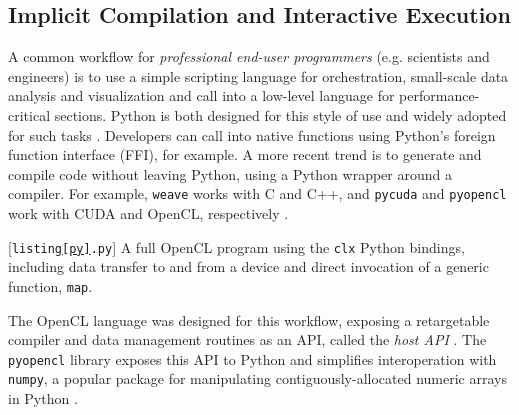 \documentclass[10pt,preprint]{sigplanconf}
\begin{document}
{\subsection{Implicit Compilation and Interactive Execution}\label{compenv}\label{backend}\label{implicit}


A common workflow for \emph{professional end-user programmers} (e.g. scientists and engineers) is to use a simple scripting language for orchestration, small-scale data analysis and visualization and call into a low-level language for performance-critical sections. Python is both designed for this style of use and widely adopted for such tasks \cite{sanner1999python,nguyen2010survey}. Developers can call into native functions using Python's foreign function interface (FFI), for example. A more recent trend is to generate and compile code without leaving Python, using a Python wrapper around a compiler. For example, \verb|weave| works with C and C++, and \verb|pycuda| and \verb|pyopencl| work with CUDA and OpenCL, respectively \cite{klockner2011pycuda}. 
\begin{codelisting}

\caption{[\texttt{listing\ref{py}.py}] A full OpenCL program using the \texttt{clx} Python bindings, including data transfer to and from a device and direct invocation of a generic function, \texttt{map}.}
\label{py}
\end{codelisting}
The OpenCL language was designed for this workflow, exposing a retargetable compiler and data management  routines as an API, called the \emph{host API} \cite{opencl11}. The \verb|pyopencl| library exposes this API to Python and simplifies interoperation with \verb|numpy|, a popular package for manipulating contiguously-allocated numeric arrays in Python \cite{klockner2011pycuda}.

}
\end{document}
